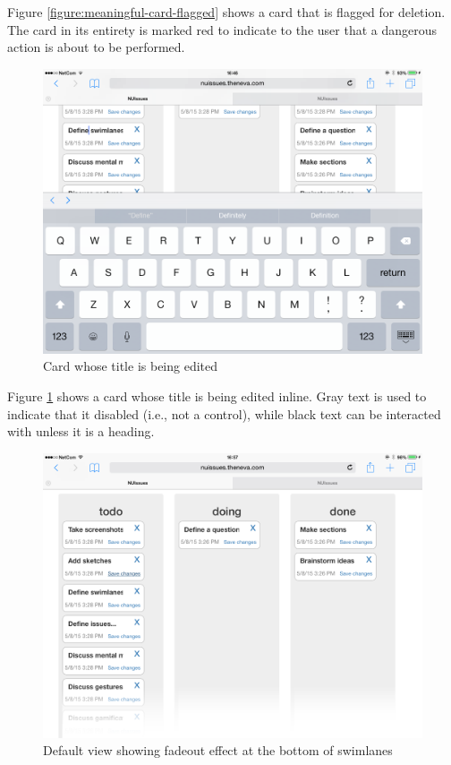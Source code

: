 Figure \ref{figure:meaningful-card-flagged} shows a card that is flagged for deletion. The card in its entirety is marked red to indicate to the user that a dangerous action is about to be performed.

\begin{figure}[H]
    \centerline{\includegraphics[scale=0.4]{images/nuissues-screenshots/09-editing-issue-title}}
    \caption{Card whose title is being edited}
    \label{figure:meaningful-card-editing}
\end{figure}

Figure \ref{figure:meaningful-card-editing} shows a card whose title is being edited inline. Gray text is used to indicate that it disabled (i.e., not a control), while black text can be interacted with unless it is a heading.

\begin{figure}[H]
    \centerline{\includegraphics[scale=0.4]{images/nuissues-screenshots/01-default-all-swimlanes}}
    \caption{Default view showing fadeout effect at the bottom of swimlanes}
    \label{figure:meaningful-swimlane-fadeout}
\end{figure}

